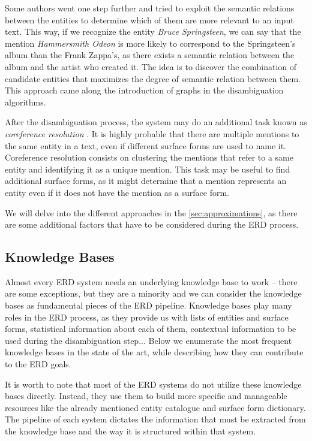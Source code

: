 Some authors went one step further and tried to exploit the semantic relations between the entities to determine which of them are more relevant to an input text. This way, if we recognize the entity \emph{Bruce Springsteen}, we can say that the mention \emph{Hammersmith Odeon} is more likely to correspond to the Springsteen's album than the Frank Zappa's, as there exists a semantic relation between the album and the artist who created it. The idea is to discover the combination of candidate entities that maximizes the degree of semantic relation between them. This approach came along the introduction of graphs in the disambiguation algorithms.

After the disambiguation process, the system may do an additional task known as \textit{coreference resolution} \cite{rao2013}. It is highly probable that there are multiple mentions to the same entity in a text, even if different surface forms are used to name it. Coreference resolution consists on clustering the mentions that refer to a same entity and identifying it as a unique mention. This task may be useful to find additional surface forms, as it might determine that a mention represents an entity even if it does not have the mention as a surface form.

We will delve into the different approaches in the \autoref{sec:approximations}, as there are some additional factors that have to be considered during the ERD process.



\subsection{Knowledge Bases}
\label{sec:knowledgeBases}

Almost every ERD system needs an underlying knowledge base to work -- there are some exceptions, but they are a minority and we can consider the knowledge bases as fundamental pieces of the ERD pipeline. Knowledge bases play many roles in the ERD process, as they provide us with lists of entities and surface forms, statistical information about each of them, contextual information to be used during the disambiguation step... Below we enumerate the most frequent knowledge bases in the state of the art, while describing how they can contribute to the ERD goals.

It is worth to note that most of the ERD systems do not utilize these knowledge bases directly. Instead, they use them to build more specific and manageable resources like the already mentioned entity catalogue and surface form dictionary. The pipeline of each system dictates the information that must be extracted from the knowledge base and the way it is structured within that system.

